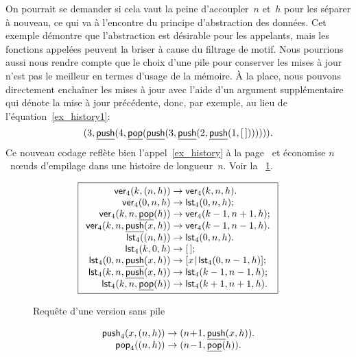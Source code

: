 On pourrait se demander si cela vaut la peine d'accoupler~\(n\)
et~\(h\) pour les séparer à nouveau, ce qui va à l'encontre du
principe d'abstraction des données. Cet exemple démontre que
l'abstraction est désirable pour les appelants, mais les fonctions
appelées peuvent la briser à cause du filtrage de motif. Nous
pourrions aussi nous rendre compte que le choix d'une pile pour
conserver les mises à jour n'est pas le meilleur en termes d'usage de
la mémoire. À la place, nous pouvons directement enchaîner les mises à
jour avec l'aide d'un argument supplémentaire qui dénote la mise à
jour précédente, donc, par exemple, au lieu de
l'équation~\eqref{ex_history1}:
\begin{equation*}
({3},{\underline{\textsf{push}}(4, \underline{\textsf{pop}}(\underline{\textsf{push}}(3, \underline{\textsf{push}}(2, \underline{\textsf{push}}(1,[\,])))))}).
\end{equation*}
Ce nouveau codage reflète
bien l'appel~\eqref{ex_history} à la page~\pageref{ex_history} et
économise \(n\)~n{\oe}uds d'empilage dans une histoire de
longueur~\(n\). Voir la \fig~\ref{fig:ver}.
\begin{figure}
\begin{equation*}
\boxed{%
\begin{array}{r@{\;}l@{\;}l}
\fun{ver}_4(k,\pair{n}{h}) & \rightarrow & \fun{ver}_4(k,n,h).\\
\fun{ver}_4(0,n,h) & \rightarrow & \fun{lst}_4(0,n,h);\\
\fun{ver}_4(k,n,\ufun{pop}(h))
                      & \rightarrow & \fun{ver}_4(k-1,n+1,h);\\
\fun{ver}_4(k,n,\ufun{push}(x,h))
                      & \rightarrow & \fun{ver}_4(k-1,n-1,h).\\
\fun{lst}_4(\pair{n}{h}) & \rightarrow & \fun{lst}_4(0,n,h).\\
\fun{lst}_4(k,0,h) & \rightarrow & \el;\\
\fun{lst}_4(0,n,\ufun{push}(x,h)) & \rightarrow
                      & \cons{x}{\fun{lst}_4(0,n-1,h)};\\
\fun{lst}_4(k,n,\ufun{push}(x,h)) & \rightarrow
                      & \fun{lst}_4(k-1,n-1,h);\\
\fun{lst}_4(k,n,\ufun{pop}(h)) & \rightarrow
                      & \fun{lst}_4(k+1,n+1,h).
\end{array}}
\end{equation*}
\caption{Requête d'une version sans pile}
\label{fig:ver}
\end{figure}
\begin{equation*}
\begin{array}{@{}r@{\;}l@{\;}l@{}}
\fun{push}_4(x,\pair{n}{h}) & \rightarrow &
\pair{n\!+\!1}{\ufun{push}(x,h)}.\\
\fun{pop}_4(\pair{n}{h}) & \rightarrow &
\pair{n\!-\!1}{\ufun{pop}(h)}.
\end{array}
\end{equation*}

